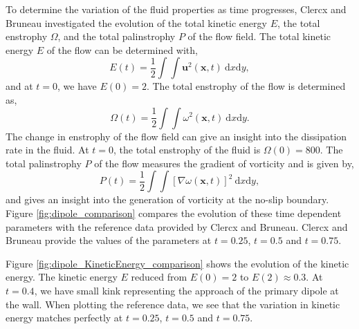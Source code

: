 To determine the variation of the fluid properties as time progresses, Clercx and Bruneau investigated the evolution of the total kinetic energy $E$, the total enstrophy $\Omega$, and the total palinstrophy $P$ of the flow field. The total kinetic energy $E$ of the flow can be determined with,
	\begin{equation}
	E(t) = \frac{1}{2} \int\int \mathbf{u}^2(\mathbf{x},t)\ \mathrm{d}x\mathrm{d}y,
	\end{equation}
and at $t=0$, we have $E(0) = 2$. The total enstrophy of the flow is determined as, 
	\begin{equation}
	\Omega(t) = \frac{1}{2}\int\int\omega^2(\mathbf{x},t)\ \mathrm{d}x\mathrm{d}y.
	\end{equation}	
The change in enstrophy of the flow field can give an insight into the dissipation rate in the fluid. At $t=0$, the total enstrophy of the fluid is $\Omega(0)=800$. The total palinstrophy $P$ of the flow measures the gradient of vorticity and is given by, 
	\begin{equation}
	P(t) = \frac{1}{2}\int\int\left[\nabla\omega(\mathbf{x},t)\right]^2\ \mathrm{d}x\mathrm{d}y,
	\end{equation}
and gives an insight into the generation of vorticity at the no-slip boundary. Figure \ref{fig:dipole_comparison} compares the evolution of these time dependent parameters with the reference data provided by Clercx and Bruneau. Clercx and Bruneau \cite{Clercx2006a} provide the values of the parameters at $t=0.25$, $t=0.5$ and $t=0.75$. 

Figure \ref{fig:dipole_KineticEnergy_comparison} shows the evolution of the kinetic energy. The kinetic energy $E$ reduced from $E(0) = 2$ to $E(2) \approx 0.3$. At $t=0.4$, we have small kink representing the approach of the primary dipole at the wall. When plotting the reference data, we see that the variation in kinetic energy matches perfectly at $t=0.25$, $t=0.5$ and $t=0.75$.


